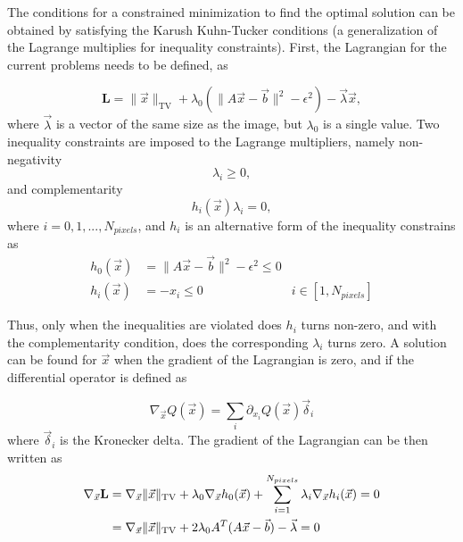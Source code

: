 The conditions for a constrained minimization to find the optimal solution can be obtained by satisfying the Karush Kuhn-Tucker conditions (a generalization of the Lagrange multiplies for inequality constraints). First, the Lagrangian for the current problems needs to be defined, as

\begin{equation}
\textbf{L}=\lVert \vec{x} \rVert_\text{TV}+\lambda_0(\lVert A \vec{x}-\vec{b}\rVert^2 - \epsilon^2)-\vec{\lambda}\vec{x},\label{eq:Lagrangian}
\end{equation}
where $\vec{\lambda}$ is a vector of the same size as the image, but $\lambda_0$ is a single value. Two inequality constraints are imposed to the Lagrange multipliers, namely non-negativity
\begin{equation}
\lambda_i \geq 0,
\end{equation}
and complementarity 
\begin{equation}
h_i(\vec{x}) \lambda_i = 0,
\end{equation}
where $i=0,1,..., N_{pixels}$, and $h_i$ is an alternative form of the inequality constrains as
\begin{align}
h_0(\vec{x}) &=\lVert A \vec{x}-\vec{b}\rVert^2 - \epsilon^2 \leq 0&\\
h_i(\vec{x}) &= -x_i \leq 0 & i \in [1, N_{pixels}]
\end{align}

Thus, only when the inequalities are violated does $h_i$ turns non-zero, and with the complementarity condition, does the corresponding $\lambda_i$ turns zero. A solution can be found for $\vec{x}$ when the gradient of the Lagrangian is zero, and if the differential operator is defined as

\begin{equation}
\nabla_{\vec{x}}Q(\vec{x})=\sum_i {\partial_{x_i}}Q(\vec{x}) \vec{\delta}_i
\end{equation}
where $\vec{\delta}_i$ is the Kronecker delta. The gradient of the Lagrangian can be then written as
\begin{align}
\nabla_{\vec{x}}\textbf{L}&=\nabla_{\vec{x}}\lVert \vec{x} \rVert_\text{TV}+\lambda_0\nabla_{\vec{x}}h_0(\vec{x})+\sum_{i=1}^{N_{pixels}}\lambda_i\nabla_{\vec{x}}h_i(\vec{x})=0 \notag \\
&=\nabla_{\vec{x}}\lVert \vec{x} \rVert_\text{TV}+2\lambda_0 A^T(A\vec{x}-\vec{b})-\vec{\lambda}=0 \label{eq:KKT}
\end{align}

